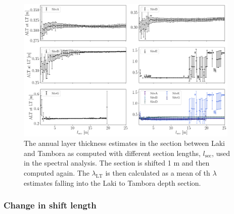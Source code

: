 \documentclass[../../CompleteThesis2/Complete_2ndDraft]{subfiles}
\begin{document}
\begin{figure}[h]
	\centering
	\includegraphics[width=0.95\textwidth]{AllCores_ALTatLT_vs_lSec.png}
	\caption[$\lambda_{\text{LT}}$ vs. Section Length]{\small The annual layer thickness estimates in the section between Laki and Tambora as computed with different section lengths, $l_{\text{sec}}$, used in the spectral analysis. The section is shifted 1 m and then computed again. The $\lambda_{\text{LT}}$ is then calculated as a mean of th $\lambda$ estimates falling into the Laki to Tambora depth section.}
	\label{fig:AllCores_ALTatLT_vs_lSec}
\end{figure}




\subsubsection[Change in $l_{shift}$]{Change in shift length}
\label{Subsubsec:Method_TestStab_ALTest_ChangeLshift}
\end{document}
